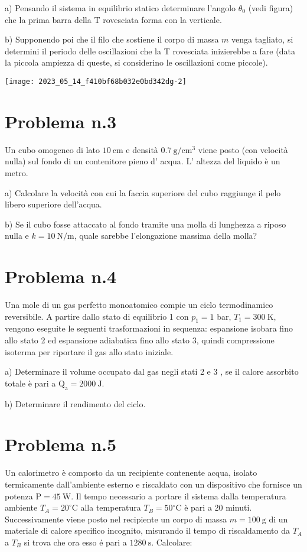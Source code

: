 \documentclass[10pt]{article}
\begin{document}
a) Pensando il sistema in equilibrio statico determinare l'angolo \(\theta_{0}\) (vedi figura) che la prima barra della T rovesciata forma con la verticale.

b) Supponendo poi che il filo che sostiene il corpo di massa \(m\) venga tagliato, si determini il periodo delle oscillazioni che la T rovesciata inizierebbe a fare (data la piccola ampiezza di queste, si considerino le oscillazioni come piccole).

\begin{center}
\texttt{[image: 2023\_05\_14\_f410bf68b032e0bd342dg-2]}
\end{center}

\section{Problema n.3}
Un cubo omogeneo di lato \(10 \mathrm{~cm}\) e densità \(0.7 \mathrm{~g} / \mathrm{cm}^{3}\) viene posto (con velocità nulla) sul fondo di un contenitore pieno d' acqua. L' altezza del liquido è un metro.

a) Calcolare la velocità con cui la faccia superiore del cubo raggiunge il pelo libero superiore dell'acqua.

b) Se il cubo fosse attaccato al fondo tramite una molla di lunghezza a riposo nulla e \(k=10 \mathrm{~N} / \mathrm{m}\), quale sarebbe l'elongazione massima della molla?

\section{Problema n.4}
Una mole di un gas perfetto monoatomico compie un ciclo termodinamico reversibile. A partire dallo stato di equilibrio 1 con \(p_{1}=1\) bar, \(T_{1}=300 \mathrm{~K}\), vengono eseguite le seguenti trasformazioni in sequenza: espansione isobara fino allo stato 2 ed espansione adiabatica fino allo stato 3, quindi compressione isoterma per riportare il gas allo stato iniziale.

a) Determinare il volume occupato dal gas negli stati 2 e 3 , se il calore assorbito totale è pari a \(\mathrm{Q}_{\mathrm{a}}=2000 \mathrm{~J}\).

b) Determinare il rendimento del ciclo.

\section{Problema n.5}
Un calorimetro è composto da un recipiente contenente acqua, isolato termicamente dall'ambiente esterno e riscaldato con un dispositivo che fornisce un potenza \(\mathrm{P}=45 \mathrm{~W}\). Il tempo necessario a portare il sistema dalla temperatura ambiente \(T_{A}=20^{\circ} \mathrm{C}\) alla temperatura \(T_{B}=50{ }^{\circ} \mathrm{C}\) è pari a 20 minuti. Successivamente viene posto nel recipiente un corpo di massa \(m=100 \mathrm{~g}\) di un materiale di calore specifico incognito, misurando il tempo di riscaldamento da \(T_{A}\) a \(T_{B}\) si trova che ora esso é pari a \(1280 \mathrm{~s}\). Calcolare:
\end{document}
